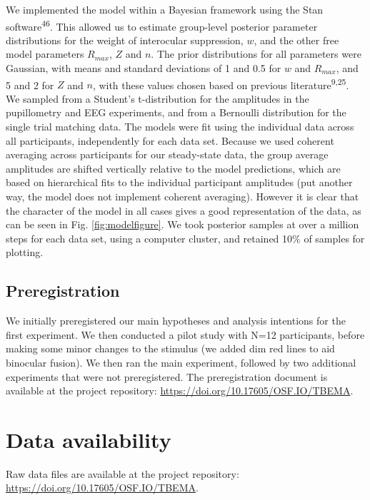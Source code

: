 \documentclass[
]{article}
\begin{document}
We implemented the model within a Bayesian framework using the Stan software\textsuperscript{46}. This allowed us to estimate group-level posterior parameter distributions for the weight of interocular suppression, \(w\), and the other free model parameters \(R_{max}\), \(Z\) and \(n\). The prior distributions for all parameters were Gaussian, with means and standard deviations of 1 and 0.5 for \(w\) and \(R_{max}\), and 5 and 2 for \(Z\) and \(n\), with these values chosen based on previous literature\textsuperscript{9,25}. We sampled from a Student's t-distribution for the amplitudes in the pupillometry and EEG experiments, and from a Bernoulli distribution for the single trial matching data. The models were fit using the individual data across all participants, independently for each data set. Because we used coherent averaging across participants for our steady-state data, the group average amplitudes are shifted vertically relative to the model predictions, which are based on hierarchical fits to the individual participant amplitudes (put another way, the model does not implement coherent averaging). However it is clear that the character of the model in all cases gives a good representation of the data, as can be seen in Fig. \ref{fig:modelfigure}. We took posterior samples at over a million steps for each data set, using a computer cluster, and retained 10\% of samples for plotting.

\hypertarget{preregistration}{%
\subsection{Preregistration}\label{preregistration}}

We initially preregistered our main hypotheses and analysis intentions for the first experiment. We then conducted a pilot study with N=12 participants, before making some minor changes to the stimulus (we added dim red lines to aid binocular fusion). We then ran the main experiment, followed by two additional experiments that were not preregistered. The preregistration document is available at the project repository: \url{https://doi.org/10.17605/OSF.IO/TBEMA}.

\hypertarget{data-availability}{%
\section{Data availability}\label{data-availability}}

Raw data files are available at the project repository: \url{https://doi.org/10.17605/OSF.IO/TBEMA}.
\end{document}
